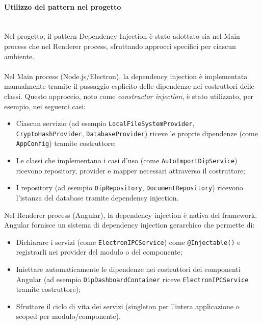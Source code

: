 \documentclass[a4paper,12pt]{article}
\begin{document}
{{{                \paragraph{Utilizzo del pattern nel progetto}\mbox{}\\
                Nel progetto, il pattern Dependency Injection è stato adottato sia nel Main process che nel Renderer process, sfruttando approcci specifici per ciascun ambiente.\\
                \\
                Nel Main process (Node.js/Electron), la dependency injection è implementata manualmente tramite il passaggio esplicito delle dipendenze nei costruttori delle classi. Questo approccio, noto come \textit{constructor injection}, è stato utilizzato, per esempio, nei seguenti casi:
                \begin{itemize}
                    \item Ciascun servizio (ad esempio \texttt{LocalFileSystemProvider},\\ \texttt{CryptoHashProvider}, \texttt{DatabaseProvider}) riceve le proprie dipendenze (come\\ \texttt{AppConfig}) tramite costruttore;
                    \item Le classi che implementano i casi d'uso (come \texttt{AutoImportDipService}) ricevono repository, provider e mapper necessari attraverso il costruttore;
                    \item I repository (ad esempio \texttt{DipRepository}, \texttt{DocumentRepository}) ricevono l'istanza del database tramite dependency injection.
                \end{itemize}
                
                \noindent Nel Renderer process (Angular), la dependency injection è nativa del framework. Angular fornisce un sistema di dependency injection gerarchico che permette di:
                \begin{itemize}
                    \item Dichiarare i servizi (come \texttt{ElectronIPCService}) come \texttt{@Injectable()} e registrarli nei provider del modulo o del componente;
                    \item Iniettare automaticamente le dipendenze nei costruttori dei componenti Angular (ad esempio \texttt{DipDashboardContainer} riceve \texttt{ElectronIPCService} tramite costruttore);
                    \item Sfruttare il ciclo di vita dei servizi (singleton per l'intera applicazione o scoped per modulo/componente).
                \end{itemize}
                
}}}
\end{document}
